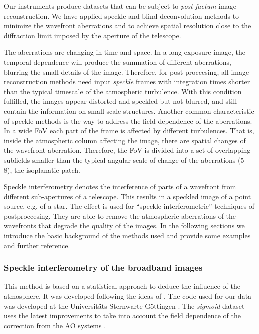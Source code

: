 Our instruments produce datasets that can be subject to \emph{post-factum} image reconstruction. We have applied speckle and blind deconvolution methods to minimize the wavefront aberrations and to achieve spatial resolution close to the diffraction limit imposed by the aperture of the telescope. 

The aberrations are changing in time and space. In a long exposure image, the temporal dependence will produce the summation of different aberrations, blurring the small details of the image.  Therefore, for post-proccesing, all image reconstruction methods need input \emph{speckle} frames with integration times shorter than the typical timescale of the atmospheric turbulence. With this condition fulfilled, the images appear distorted and speckled but not blurred, and still contain the information on small-scale structures. Another common characteristic of speckle methods is the way to address the field dependence of the aberrations. In a wide FoV each part of the frame is affected by different turbulences. That is, inside the atmospheric column affecting the image, there are spatial changes of the wavefront aberration. Therefore, the FoV is divided into a set of overlapping subfields smaller than the typical angular scale of change of the aberrations (5\arcsec- - 8\arcsec), the isoplanatic patch.



Speckle interferometry denotes the interference of parts of a wavefront from different sub-apertures of a telescope. This results in a speckled image of a point source, e.g. of a  star. The effect is used for ``speckle interferometric'' techniques of postproccesing. They are able to remove the atmospheric aberrations of the wavefronts that degrade the quality of the images. In the following sections we introduce the basic background of the methods used and provide some examples and further reference.

\subsubsection{Speckle interferometry of the broadband images\label{SIb}}
This method is based on a statistical approach to deduce the influence of the atmosphere. It was developed following the ideas of \cite{1965JOSA...55.1427F,1970A&A.....6...85L,1973JOSA...63..971K,1977OptCo..21...55W,von-der-Luehe:1984fk} . The code used for our data was developed at the  Universit\"ats-Sternwarte G\"ottingen \citep{1996A&AS..120..195D} . The \emph{sigmoid} dataset uses the latest improvements to take into account the field dependence of the correction from the AO systems \citep{2006A&A...454.1011P}.

